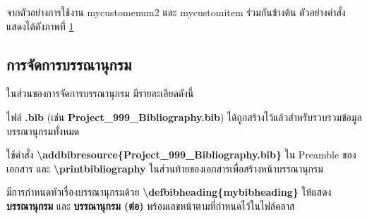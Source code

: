 \hspace*{1.5em} %
จากตัวอย่างการใช้งาน mycustomenum2 และ mycustomitem ร่วมกันข้างต้น ตัวอย่างคำสั่งแสดงได้ดังภาพที่ \ref{fig3:ExampleCreateEnum2MixItem}

\begin{figure}[htbp]
\centering
{}
\caption{}
\label{fig3:ExampleCreateEnum2MixItem}
\end{figure}



\subsection{การจัดการบรรณานุกรม}
\hspace*{1.5em} %
ในส่วนของการจัดการบรรณานุกรม มีรายละเอียดดังนี้

\begin{mycustomitem}
    \item ไฟล์ \textbf{.bib} (เช่น \textbf{Project\_999\_Bibliography.bib}) ได้ถูกสร้างไว้แล้วสำหรับรวบรวมข้อมูลบรรณานุกรมทั้งหมด
    \item ใช้คำสั่ง \textbf{\textbackslash addbibresource\{Project\_999\_Bibliography.bib\}} ใน Preamble ของเอกสาร และ \textbf{\textbackslash printbibliography} ในส่วนท้ายของเอกสารเพื่อสร้างหน้าบรรณานุกรม
    \item มีการกำหนดหัวเรื่องบรรณานุกรมด้วย \textbf{\textbackslash defbibheading\{mybibheading\}} ให้แสดง \textbf{บรรณานุกรม} และ \textbf{บรรณานุกรม (ต่อ)} พร้อมเลขหน้าตามที่กำหนดไว้ในไฟล์คลาส
\end{mycustomitem}


